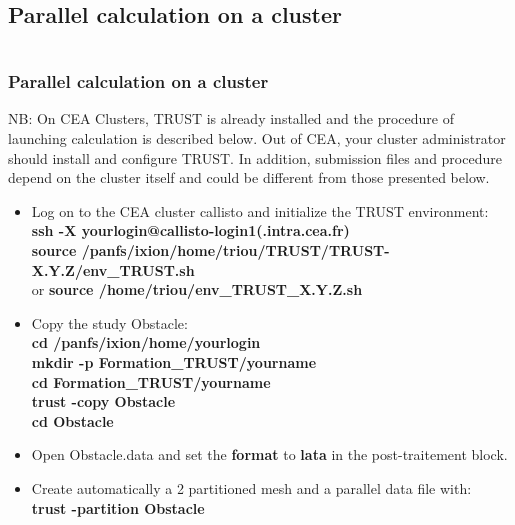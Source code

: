 \documentclass[10pt, hyperref={unicode=true,pdfusetitle, bookmarks=true,bookmarksnumbered=false,bookmarksopen=false, breaklinks=false,pdfborder={0 0 1},backref=true,colorlinks=true,linkcolor=darkblue,pageanchor}]{beamer}
\begin{document}
\subsection{Parallel calculation on a cluster} \label{exo_para_3}
\begin{frame}
\begin{small}
\begin{columns}[c] 
\tableofcontents[sections={1-9},currentsection, currentsubsection]
\tableofcontents[sections={10-16},currentsection, currentsubsection]
\end{columns}
\end{small}
\end{frame}
\begin{frame}
\frametitle{Parallel calculation on a cluster}
\begin{block}{}
NB: On CEA Clusters, TRUST is already installed and the procedure of launching calculation is described below. Out of CEA, your cluster administrator should install and configure TRUST. In addition, submission files and procedure depend on the cluster itself and could be different from those presented below.
\begin{itemize}
\item Log on to the CEA cluster callisto and initialize the TRUST environment: \\
{\small{
\textbf{ssh -X yourlogin@callisto-login1(.intra.cea.fr)} \\
\textbf{source /panfs/ixion/home/triou/TRUST/TRUST-X.Y.Z/env\_TRUST.sh}\\
or 
\textbf{source /home/triou/env\_TRUST\_X.Y.Z.sh}\\
}}

\item Copy the study Obstacle:\\
\textbf{cd /panfs/ixion/home/yourlogin}\\
\textbf{mkdir  -p  Formation\_TRUST/yourname} \\
\textbf{cd Formation\_TRUST/yourname} \\
\textbf{trust -copy Obstacle} \\
\textbf{cd Obstacle} \\

\item Open Obstacle.data and set the \textbf{format} to \textbf{lata} in the post-traitement block.

\item Create automatically a 2 partitioned mesh and a parallel data file with:\\
\textbf{trust -partition Obstacle}

\end{itemize}

\end{block}
\end{frame}
\end{document}
